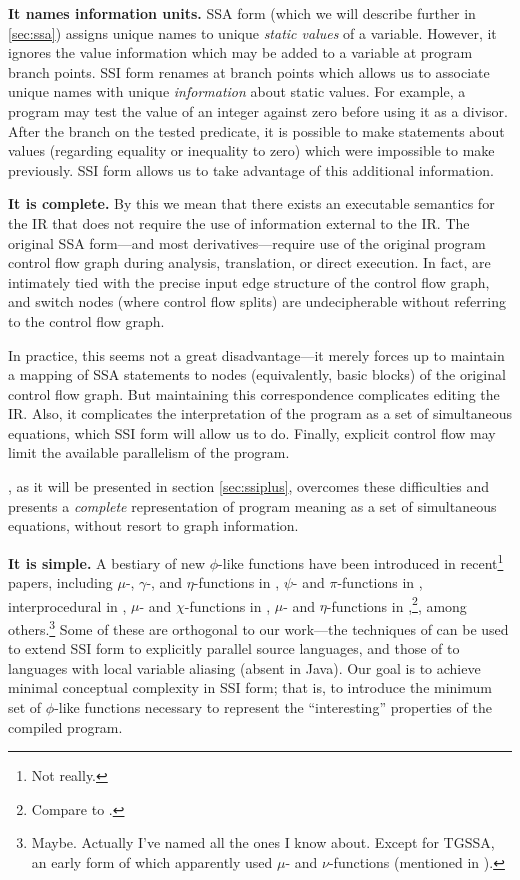 \documentclass[12pt,notitlepage]{article}
\begin{document}
\textbf{It names information units.}  SSA form (which we will describe
further in \ref{sec:ssa}) assigns unique names to unique \emph{static
values} of a variable.  However, it ignores the value information
which may be added to a variable at program branch points.  SSI form
renames at branch points which allows us to associate unique names
with unique \emph{information} about static values.  For example, a
program may test the value of an integer against zero before using it
as a divisor.  After the branch on the tested predicate, it is
possible to make statements about values (regarding equality or
inequality to zero) which were impossible to make previously.  SSI
form allows us to take advantage of this additional information.

\textbf{It is complete.}  By this we mean that there exists an
executable semantics for the IR that does not require the use of
information external to the IR.  The original SSA form---and most
derivatives---require use of the original program control flow graph
during analysis, translation, or direct execution.  In fact,
 are intimately tied with the precise input edge
structure of the control flow graph, and switch nodes (where control
flow splits) are undecipherable without referring to the control flow
graph.

In practice, this seems not a great disadvantage---it merely forces up to
maintain a mapping of SSA statements to nodes (equivalently, basic
blocks) of the original control flow graph.  But maintaining this
correspondence complicates editing the IR.  Also, it complicates the
interpretation of the program as a set of simultaneous equations,
which SSI form will allow us to do.  Finally, explicit control flow
may limit the available parallelism of the program.

\ssiplus, as it will be presented in section \ref{sec:ssiplus},
overcomes these difficulties and presents a \emph{complete}
representation of program meaning as a set of simultaneous equations,
without resort to graph information.

\textbf{It is simple.}  A bestiary of new $\phi$-like functions have
been introduced in recent\footnote{Not really.} papers, including
$\mu$-, $\gamma$-, and $\eta$-functions in \cite{ballance90:pdw,tu95:gssa},
$\psi$- and $\pi$-functions in \cite{lee99:parssa},
interprocedural  in \cite{liao99:issa},
$\mu$- and $\chi$-functions in \cite{chow96:hssa},
$\mu$- and $\eta$-functions in \cite{gerlek95:inductssa},\footnote{Compare to
\cite{ballance90:pdw,tu95:gssa}.}, among others.\footnote{Maybe.
Actually I've named all the ones I know about.  Except for TGSSA,
an early form of which apparently used $\mu$- and $\nu$-functions (mentioned in
\cite{weise94:vdg}).}
Some of these are orthogonal to our work---the techniques of
\cite{lee99:parssa} can be used to extend SSI form to explicitly
parallel source languages, and those of \cite{chow96:hssa} to
languages with local variable aliasing (absent in Java).  Our goal is
to achieve minimal conceptual complexity in SSI form; that is, to
introduce the minimum set of $\phi$-like functions necessary to
represent the ``interesting'' properties of the compiled program.
\end{document}
